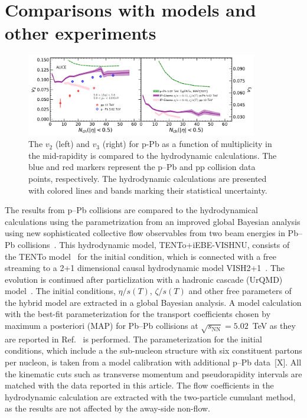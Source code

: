 \section{Comparisons with models and other experiments}
\label{sec:theory}

\begin{figure}[h!]
	\centering
	\includegraphics[width=0.9\textwidth]{figures/Fig6_v2Mult_allSystems_Hydro.pdf} 
	\caption{The $v_2$ (left) and $v_3$ (right) for p-Pb as a function of multiplicity in the mid-rapidity is compared to the hydrodynamic calculations. The blue and red markers represent the p--Pb and pp collision data points, respectively. The hydrodynamic calculations are presented with colored lines and bands marking their statistical uncertainty.} 
	\label{fig:vnmult_model}
\end{figure}

The results from p--Pb collisions are compared to the hydrodynamical calculations using the parametrization from an improved global Bayesian analysis using new sophisticated collective flow observables from two beam energies in Pb--Pb collisions~\cite{Parkkila:2021yha}. This hydrodynamic model, {TENTo}+iEBE-VISHNU, consists of the {TENTo} model~\cite{Moreland:2014oya} for the initial condition, which is connected with a free streaming to a 2+1 dimensional causal hydrodynamic model VISH2+1~\cite{Shen:2014vra}. The evolution is continued after particlization with a hadronic cascade (UrQMD) model~\cite{Bass:1998ca,Bleicher:1999xi}. The initial conditions, $\eta/s(T)$, $\zeta/s(T)$ and other free parameters of the hybrid model are extracted in a global Bayesian analysis.
A model calculation with the best-fit parameterization for the transport coefficients chosen by maximum a posteriori (MAP) for Pb--Pb collisions at $\sqrt{s_{\text{NN}}}=5.02$~TeV as they are reported in Ref.~\cite{Parkkila:2021yha} is performed. The parameterization for the initial conditions, which include a the sub-nucleon structure with six constituent partons per nucleon, is taken from a model calibration with additional p--Pb data~[X]. All the kinematic cuts such as transverse momentum and pseudorapidity intervals are matched with the data reported in this article. The flow coefficients in the hydrodynamic calculation are extracted with the two-particle cumulant method, as the results are not affected by the away-side non-flow.

